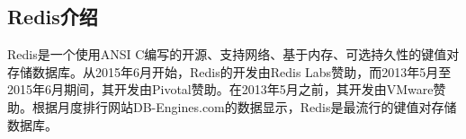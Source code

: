 \documentclass[../../../interview-questions.tex]{subfiles}
\begin{document}
\subsection{Redis介绍}

Redis是一个使用ANSI C编写的开源、支持网络、基于内存、可选持久性的键值对存储数据库。从2015年6月开始，Redis的开发由Redis Labs赞助，而2013年5月至2015年6月期间，其开发由Pivotal赞助。在2013年5月之前，其开发由VMware赞助。根据月度排行网站DB-Engines.com的数据显示，Redis是最流行的键值对存储数据库。
\end{document}
